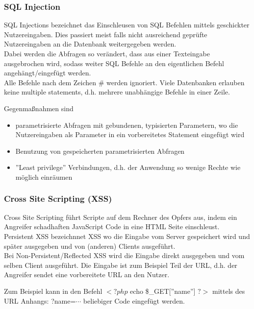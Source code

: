 \documentclass[a4paper,12pt,leqno]{article}
\begin{document}
\subsubsection{SQL Injection}

SQL Injections bezeichnet das Einschleusen von SQL Befehlen mittels geschickter Nutzereingaben. Dies passiert meist falls nicht ausreichend geprüfte Nutzereingaben an die Datenbank weitergegeben werden.\\

Dabei werden die Abfragen so verändert, dass aus einer Texteingabe ausgebrochen wird, sodass weiter SQL Befehle an den eigentlichen Befehl angehängt/eingefügt werden.\\
Alle Befehle nach dem Zeichen \# werden ignoriert. Viele Datenbanken erlauben keine multiple statements, d.h. mehrere unabhängige Befehle in einer Zeile.

Gegenmaßnahmen sind 
\begin{itemize}
\item parametrisierte Abfragen mit gebundenen, typisierten Parametern, wo die Nutzereingaben als Parameter in ein vorbereitetes Statement eingefügt wird
\item Benutzung von gespeicherten parametrisierten Abfragen
\item ''Least privilege'' Verbindungen, d.h. der Anwendung so wenige Rechte wie möglich einräumen
\end{itemize}

\subsubsection{Cross Site Scripting (XSS)}

Cross Site Scripting führt Scripte auf dem Rechner des Opfers aus, indem ein Angreifer schadhaften JavaScript Code in eine HTML Seite einschleust.\\

Persistent XSS bezeichnnet XSS wo die Eingabe vom Server gespeichert wird und später ausgegeben und von (anderen) Clients ausgeführt.\\

Bei Non-Persistent/Reflected XSS wird die Eingabe direkt ausgegeben und vom selben Client ausgeführt. Die Eingabe ist zum Beispiel Teil der URL, d.h. der Angreifer sendet eine vorbereitete URL an den Nutzer.

Zum Beispiel kann in den Befehl $<?php$ echo \$\_GET[''name''] $?>$ mittels des URL Anhangs: ?name=$\cdots$ beliebiger Code eingefügt werden.\\
\end{document}
